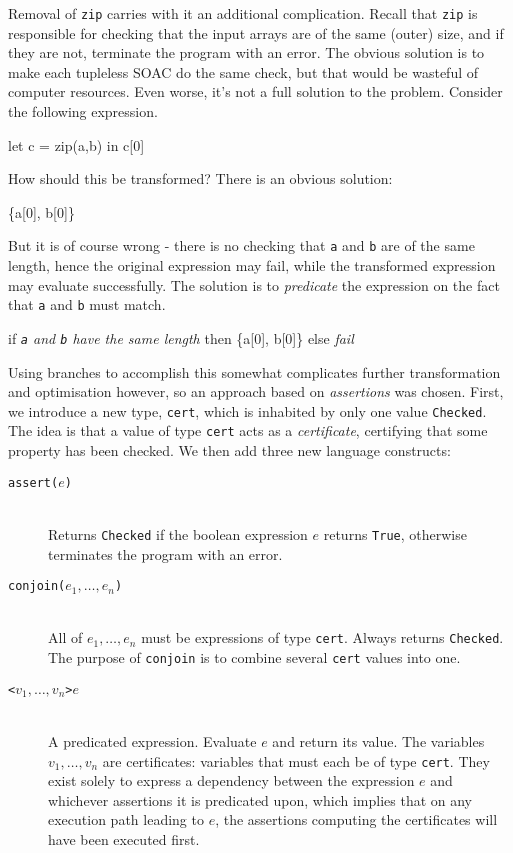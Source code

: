 Removal of \texttt{zip} carries with it an additional complication.
Recall that \texttt{zip} is responsible for checking that the input
arrays are of the same (outer) size, and if they are not, terminate
the program with an error.  The obvious solution is to make each
tupleless SOAC do the same check, but that would be wasteful of
computer resources.  Even worse, it's not a full solution to the
problem.  Consider the following expression.
\begin{colorcode}
let c = zip(a,b) in
c[0]
\end{colorcode}
How should this be transformed?  There is an obvious solution:
\begin{colorcode}
\{a[0], b[0]\}
\end{colorcode}
But it is of course wrong - there is no checking that \texttt{a} and
\texttt{b} are of the same length, hence the original expression may
fail, while the transformed expression may evaluate successfully.  The
solution is to \textit{predicate} the expression on the fact that
\texttt{a} and \texttt{b} must match.
\begin{colorcode}
if \textit{\texttt{a} and \texttt{b} have the same length}
then \{a[0], b[0]\}
else \textit{fail}
\end{colorcode}
Using branches to accomplish this somewhat complicates further
transformation and optimisation however, so an approach based on
\textit{assertions} was chosen.  First, we introduce a new type,
\texttt{cert}, which is inhabited by only one value \texttt{Checked}.
The idea is that a value of type \texttt{cert} acts as a
\textit{certificate}, certifying that some property has been checked.
We then add three new language constructs:

\begin{description}
\item[\texttt{assert($e$)}]\hfill\\
  Returns \texttt{Checked} if the boolean expression $e$ returns
  \texttt{True}, otherwise terminates the program with an error.

\item[\texttt{conjoin($e_{1}, \ldots, e_{n}$)}]\hfill\\
  All of $e_{1}, \ldots, e_{n}$ must be expressions of type
  \texttt{cert}.  Always returns \texttt{Checked}.  The purpose of
  \texttt{conjoin} is to combine several \texttt{cert} values into
  one.

\item[\texttt{<$v_{1},\ldots,v_{n}$>$e$}]\hfill\\
  A predicated expression.  Evaluate $e$ and return its value.  The
  variables $v_{1},\ldots,v_{n}$ are certificates: variables that must
  each be of type \texttt{cert}.  They exist solely to express a
  dependency between the expression $e$ and whichever assertions it is
  predicated upon, which implies that on any execution path leading to
  $e$, the assertions computing the certificates will have been
  executed first.
\end{description}

